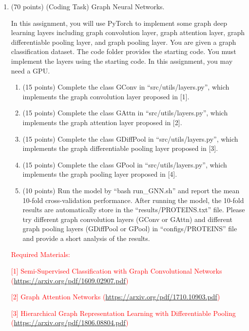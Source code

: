 \documentclass[11pt]{article}
\begin{document}
\begin{enumerate}

    \item (70 points) (Coding Task) Graph Neural Networks.
    
    In this assignment, you will use PyTorch to implement some graph deep learning layers including graph convolution layer, graph attention layer, graph differentiable pooling layer, and graph pooling layer. You are given a graph classification dataset. The code folder provides the starting code. You must implement the layers using the starting code. In this assignment, you may need a GPU.

    \begin{enumerate}
        \item (15 points) Complete the class GConv in ``src/utils/layers.py'', which implements the graph convolution layer proposed in [1].
        \item (15 points) Complete the class GAttn in ``src/utils/layers.py'', which implements the graph attention layer proposed in [2].
        \item (15 points) Complete the class GDiffPool in ``src/utils/layers.py'', which implements the graph differentiable pooling layer proposed in [3].
        \item (15 points) Complete the class GPool in ``src/utils/layers.py'', which implements the graph pooling layer proposed in [4].
        \item (10 points) Run the model by ``bash run\_GNN.sh'' and report the mean 10-fold cross-validation performance. After running the model, the 10-fold results are automatically store in the ``results/PROTEINS.txt'' file. Please try different graph convolution layers (GConv or GAttn) and different graph pooling layers (GDiffPool or GPool) in ``configs/PROTEINS'' file and provide a short analysis of the results.
    \end{enumerate}

    \textcolor{red}{Required Materials:}

    \textcolor{red}{[1] Semi-Supervised Classification with Graph Convolutional Networks (\url{https://arxiv.org/pdf/1609.02907.pdf})}

    \textcolor{red}{[2] Graph Attention Networks (\url{https://arxiv.org/pdf/1710.10903.pdf})}

    \textcolor{red}{[3] Hierarchical Graph Representation Learning with Differentiable Pooling (\url{https://arxiv.org/pdf/1806.08804.pdf})}


\end{enumerate}
\end{document}
